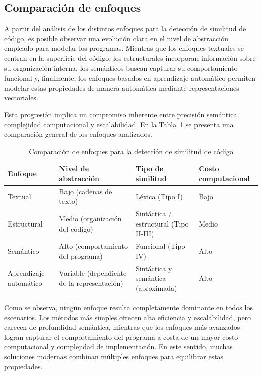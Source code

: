 \subsection{Comparación de enfoques}
A partir del análisis de los distintos enfoques para la detección de similitud de código, es posible observar una evolución clara en el nivel de abstracción empleado para modelar los programas. Mientras que los enfoques textuales se centran en la superficie del código, los estructurales incorporan información sobre su organización interna, los semánticos buscan capturar su comportamiento funcional y, finalmente, los enfoques basados en aprendizaje automático permiten modelar estas propiedades de manera automática mediante representaciones vectoriales.

Esta progresión implica un compromiso inherente entre precisión semántica, complejidad computacional y escalabilidad. En la Tabla~\ref{tab:comparacion_enfoques} se presenta una comparación general de los enfoques analizados.

\begin{table}[H]
\centering
\caption{Comparación de enfoques para la detección de similitud de código}
\label{tab:comparacion_enfoques}
\begin{tabular}{|p{3cm}|p{3cm}|p{3cm}|p{2.5cm}|}
\hline
\textbf{Enfoque} & \textbf{Nivel de abstracción} & \textbf{Tipo de similitud} & \textbf{Costo computacional} \\ \hline

Textual & Bajo (cadenas de texto) & Léxica (Tipo I) & Bajo \\ \hline

Estructural & Medio (organización del código) & Sintáctica / estructural (Tipo II-III) & Medio \\ \hline

Semántico & Alto (comportamiento del programa) & Funcional (Tipo IV) & Alto \\ \hline

Aprendizaje automático & Variable (dependiente de la representación) & Sintáctica y semántica (aproximada) & Alto \\ \hline

\end{tabular}
\end{table}

Como se observa, ningún enfoque resulta completamente dominante en todos los escenarios. Los métodos más simples ofrecen alta eficiencia y escalabilidad, pero carecen de profundidad semántica, mientras que los enfoques más avanzados logran capturar el comportamiento del programa a costa de un mayor costo computacional y complejidad de implementación. En este sentido, muchas soluciones modernas combinan múltiples enfoques para equilibrar estas propiedades.


